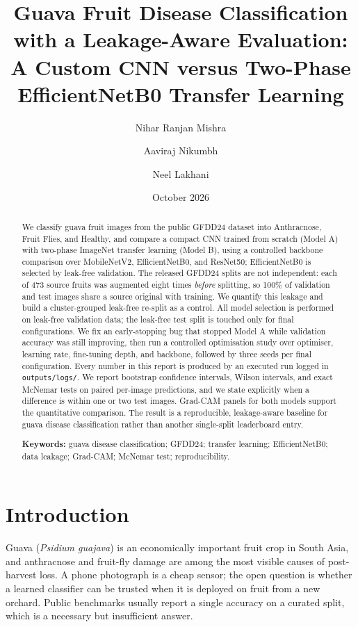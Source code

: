 \documentclass[11pt,a4paper]{article}
\title{\vspace{-1.2cm}\textbf{Guava Fruit Disease Classification with a Leakage-Aware Evaluation:\\
A Custom CNN versus Two-Phase EfficientNetB0 Transfer Learning}}
\author{Nihar Ranjan Mishra \and Aaviraj Nikumbh \and Neel Lakhani}
\date{October 2026}
\begin{document}
\maketitle

\begin{abstract}
\noindent
We classify guava fruit images from the public GFDD24 dataset into
Anthracnose, Fruit Flies, and Healthy, and compare a compact CNN trained from
scratch (Model A) with two-phase ImageNet transfer learning (Model B), using a
controlled backbone comparison over MobileNetV2, EfficientNetB0, and ResNet50;
EfficientNetB0 is selected by leak-free validation. The released GFDD24 splits
are not independent: each of 473 source
fruits was augmented eight times \emph{before} splitting, so 100\% of
validation and test images share a source original with training. We quantify
this leakage and build a cluster-grouped leak-free re-split as a control. All
model selection is performed on leak-free validation data; the leak-free test
split is touched only for final configurations. We fix an early-stopping bug
that stopped Model A while validation accuracy was still improving, then run a
controlled optimisation study over optimiser, learning rate, fine-tuning depth,
and backbone, followed by three seeds per final configuration. Every number in
this report is produced by an executed run logged in
\texttt{outputs/logs/}. We report bootstrap confidence intervals, Wilson
intervals, and exact McNemar tests on paired per-image predictions, and we
state explicitly when a difference is within one or two test images. Grad-CAM
panels for both models support the quantitative comparison. The result is a
reproducible, leakage-aware baseline for guava disease classification rather
than another single-split leaderboard entry.
\vspace{0.3em}

\noindent\textbf{Keywords:} guava disease classification; GFDD24; transfer
learning; EfficientNetB0; data leakage; Grad-CAM; McNemar test;
reproducibility.
\end{abstract}

\section{Introduction}
Guava (\textit{Psidium guajava}) is an economically important fruit crop in
South Asia, and anthracnose and fruit-fly damage are among the most visible
causes of post-harvest loss. A phone photograph is a cheap sensor; the open
question is whether a learned classifier can be trusted when it is deployed on
fruit from a new orchard. Public benchmarks usually report a single accuracy
on a curated split, which is a necessary but insufficient answer.
\end{document}
